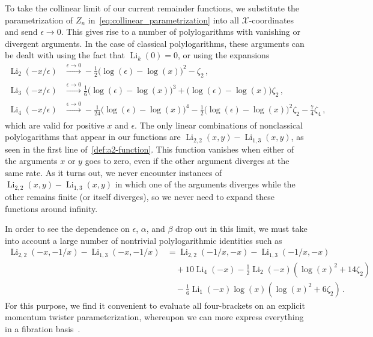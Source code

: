 \documentclass[11pt]{article}
\DeclareMathOperator{\Li}{Li}
\def\x{\mathcal{X}}
\begin{document}
To take the collinear limit of our current remainder functions, we substitute the parametrization of $Z_n$ in~\eqref{eq:collinear_parametrization} into all $\x$-coordinates and send $\epsilon \to 0$. This gives rise to a number of polylogarithms with vanishing or divergent arguments. In the case of classical polylogarithms, these arguments can be dealt with using the fact that $\Li_k(0) = 0$, or using the expansions
\begin{align}
\Li_2(-x/\epsilon) &\xrightarrow[]{\epsilon \to 0} - \frac{1}{2} \big(\log(\epsilon) - \log (x) \big)^2  - \zeta_2 \, ,\\
\Li_3(-x/\epsilon) &\xrightarrow[]{\epsilon \to 0}  \frac{1}{6} \big(\log(\epsilon) - \log (x) \big)^3 + 
\big(\log(\epsilon) - \log (x) \big) \zeta_2   \, ,\\
\Li_4(-x/\epsilon) &\xrightarrow[]{\epsilon \to 0}  -\frac{1}{24} \big(\log(\epsilon) - \log (x) \big)^4 - 
  \frac{1}{2} \big(\log(\epsilon) - \log (x) \big)^2 \zeta_2 - \frac{7}{4} \zeta_4  \, ,
\end{align} 
which are valid for positive $x$ and $\epsilon$. The only linear combinations of nonclassical polylogarithms that appear in our functions are $\Li_{2, 2}(x, y) - \Li_{1, 3}(x, y)$, as seen in the first line of~\eqref{def:a2-function}. This function vanishes when either of the arguments $x$ or $y$ goes to zero, even if the other argument diverges at the same rate. As it turns out, we never encounter instances of $\Li_{2, 2}(x, y) - \Li_{1, 3}(x, y)$ in which one of the arguments diverges while the other remains finite (or itself diverges), so we never need to expand these functions around infinity. 

In order to see the dependence on $\epsilon$, $\alpha$, and $\beta$ drop out in this limit, we must take into account a large number of nontrivial polylogarithmic identities such as
\begin{align}
\Li_{2, 2}(-x, -1/x) - \Li_{1, 3}(-x, -1/x) &=  \Li_{2, 2}(-1/x, -x) - \Li_{1, 3}(-1/x, -x)  \nonumber \\
&\quad  + 10 \Li_4(-x)  - \frac{1}{2} \Li_2(-x) \left( \log(x)^2 + 14 \zeta_2 \right)   \\ &\quad  - \frac{1}{6} \Li_1(- x) \log(x) \left( \log(x)^2 + 6 \zeta_2 \right) \, .   \nonumber
\end{align}
For this purpose, we find it convenient to evaluate all four-brackets on an explicit momentum twister parameterization, whereupon we can more express everything in a fibration basis~\cite{Brown:2009qja}.
\end{document}
